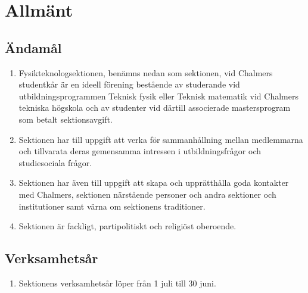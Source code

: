 \documentclass[11pt,a4paper]{article}
\begin{document}
\clearpage


\tableofcontents

\clearpage




\section{Allmänt}

\subsection{Ändamål}

\begin{enumerate}[\thesubsection .1]

  \item Fysikteknologsektionen, benämns nedan som sektionen, vid Chalmers studentkår är en ideell förening bestående av studerande vid utbildningsprogrammen Teknisk fysik eller Teknisk matematik vid Chalmers tekniska högskola och av studenter vid därtill associerade mastersprogram som betalt sektionsavgift.

  \item Sektionen har till uppgift att verka för samman\-hållning mellan
  med\-lem\-mar\-na och tillvarata deras gemensamma intressen i
  ut\-bild\-nings\-fråg\-or och studiesociala frågor.

  \item Sektionen har även till uppgift att skapa och upprätthålla
  goda kontakter med Chalmers, sektionen närstående personer och andra
  sektioner och institutioner samt värna om sektionens traditioner.

  \item Sektionen är fackligt, partipolitiskt och religiöst oberoende.

\end{enumerate}



\subsection{Verksamhetsår}

\begin{enumerate}[\thesubsection .1]

   \item Sektionens verksamhetsår löper från 1 juli till 30 juni.

\end{enumerate}

\newpage
\end{document}

